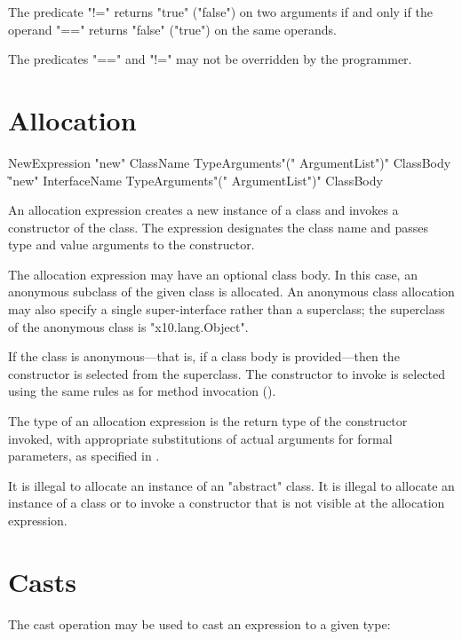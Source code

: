 The predicate \xcd"!=" returns \xcd"true" (\xcd"false") on two
arguments if and only if the operand \xcd"==" returns \xcd"false"
(\xcd"true") on the same operands.

The predicates \xcd"==" and \xcd"!=" may not be overridden by the
programmer.

\section{Allocation}
\label{ClassCreation}

\begin{grammar}
NewExpression \: \xcd"new" ClassName TypeArguments\opt \xcd"(" ArgumentList\opt \xcd")"
        ClassBody\opt \\
  \| \xcd"new" InterfaceName TypeArguments\opt \xcd"(" ArgumentList\opt \xcd")"
        ClassBody
\end{grammar}

An allocation expression creates a new instance of a class and
invokes a constructor of the class.
The expression designates the class name and passes
type and value arguments to the constructor.

The allocation expression may have an optional class body.
In this case, an anonymous subclass of the given class is
allocated.   An anonymous class allocation may also specify a
single super-interface rather than a superclass; the superclass
of the anonymous class is \xcd"x10.lang.Object".

If the class is anonymous---that is, if a class body is
provided---then the constructor is selected from the superclass.
The constructor to invoke is selected using the same rules as
for method invocation ().

The type of an allocation expression
is the return type of the constructor invoked, with appropriate
substitutions  of actual arguments for formal parameters, as
specified in .

It is illegal to allocate an instance of an \xcd"abstract" class.
It is illegal to allocate an instance of a class or to invoke a
constructor that is not visible at
the allocation expression.


\section{Casts}\label{ClassCast}

The cast operation may be used to cast an expression to a given type:

